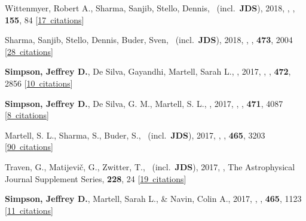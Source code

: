 \item[{\color{numcolor}\scriptsize14}] Wittenmyer, Robert A., Sharma, Sanjib, Stello, Dennis, \etal\ (incl.\ \textbf{JDS}), 2018, , \aj, \textbf{155}, 84 [\href{https://ui.adsabs.harvard.edu/#abs/2018AJ....155...84W}{17~citations}]

\item[{\color{numcolor}\scriptsize13}] Sharma, Sanjib, Stello, Dennis, Buder, Sven, \etal\ (incl.\ \textbf{JDS}), 2018, , \mnras, \textbf{473}, 2004 [\href{https://ui.adsabs.harvard.edu/#abs/2018MNRAS.473.2004S}{28~citations}]

\item[{\color{numcolor}\scriptsize12}] \textbf{Simpson, Jeffrey D.}, De Silva, Gayandhi, Martell, Sarah L., \etal, 2017, , \mnras, \textbf{472}, 2856 [\href{https://ui.adsabs.harvard.edu/#abs/2017MNRAS.472.2856S}{10~citations}]

\item[{\color{numcolor}\scriptsize11}] \textbf{Simpson, Jeffrey D.}, De Silva, G. M., Martell, S. L., \etal, 2017, , \mnras, \textbf{471}, 4087 [\href{https://ui.adsabs.harvard.edu/#abs/2017MNRAS.471.4087S}{8~citations}]

\item[{\color{numcolor}\scriptsize10}] Martell, S. L., Sharma, S., Buder, S., \etal\ (incl.\ \textbf{JDS}), 2017, , \mnras, \textbf{465}, 3203 [\href{https://ui.adsabs.harvard.edu/#abs/2017MNRAS.465.3203M}{90~citations}]

\item[{\color{numcolor}\scriptsize9}] Traven, G., Matijevi{\v{c}}, G., Zwitter, T., \etal\ (incl.\ \textbf{JDS}), 2017, , The Astrophysical Journal Supplement Series, \textbf{228}, 24 [\href{https://ui.adsabs.harvard.edu/#abs/2017ApJS..228...24T}{19~citations}]

\item[{\color{numcolor}\scriptsize8}] \textbf{Simpson, Jeffrey D.}, Martell, Sarah L., \& Navin, Colin A., 2017, , \mnras, \textbf{465}, 1123 [\href{https://ui.adsabs.harvard.edu/#abs/2017MNRAS.465.1123S}{11~citations}]

